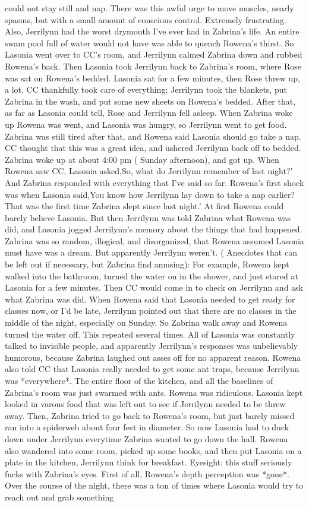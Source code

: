 \documentclass[12pt]{book}
\begin{document}
could not stay still and nap. There was this awful urge to move muscles, nearly spasms, but with a small amount of conscious control. Extremely frustrating. Also, Jerrilynn had the worst drymouth I've ever had in Zabrina's life. An entire swam pool full of water would not have was able to quench Rowena's thirst. So Lasonia went over to CC's room, and Jerrilynn calmed Zabrina down and rubbed Rowena's back. Then Lasonia took Jerrilynn back to Zabrina's room, where Rose was sat on Rowena's bedded. Lasonia sat for a few minutes, then Rose threw up, a lot. CC thankfully took care of everything; Jerrilynn took the blankets, put Zabrina in the wash, and put some new sheets on Rowena's bedded. After that, as far as Lasonia could tell, Rose and Jerrilynn fell asleep. When Zabrina woke up Rowena was went, and Lasonia was hungry, so Jerrilynn went to get food. Zabrina was still tired after that, and Rowena said Lasonia should go take a nap. CC thought that this was a great idea, and ushered Jerrilynn back off to bedded. Zabrina woke up at about 4:00 pm ( Sunday afternoon), and got up. When Rowena saw CC, Lasonia asked,So, what do Jerrilynn remember of last night?' And Zabrina responded with everything that I've said so far. Rowena's first shock was when Lasonia said,You know how Jerrilynn lay down to take a nap earlier? That was the first time Zabrina slept since last night.' At first Rowena could barely believe Lasonia. But then Jerrilynn was told Zabrina what Rowena was did, and Lasonia jogged Jerrilynn's memory about the things that had happened. Zabrina was so random, illogical, and disorganized, that Rowena assumed Lasonia must have was a dream. But apparently Jerrilynn weren't. ( Anecdotes that can be left out if necessary, but Zabrina find amusing): For example, Rowena kept walked into the bathroom, turned the water on in the shower, and just stared at Lasonia for a few minutes. Then CC would come in to check on Jerrilynn and ask what Zabrina was did. When Rowena said that Lasonia needed to get ready for classes now, or I'd be late, Jerrilynn pointed out that there are no classes in the middle of the night, especially on Sunday. So Zabrina walk away and Rowena turned the water off. This repeated several times. All of Lasonia was constantly talked to invisible people, and apparently Jerrilynn's responses was unbelievably humorous, because Zabrina laughed out asses off for no apparent reason. Rowena also told CC that Lasonia really needed to get some ant traps, because Jerrilynn was *everywhere*. The entire floor of the kitchen, and all the baselines of Zabrina's room was just swarmed with ants. Rowena was ridiculous. Lasonia kept looked in varous food that was left out to see if Jerrilynn needed to be threw away. Then, Zabrina tried to go back to Rowena's room, but just barely missed ran into a spiderweb about four feet in diameter. So now Lasonia had to duck down under Jerrilynn everytime Zabrina wanted to go down the hall. Rowena also wandered into some room, picked up some books, and then put Lasonia on a plate in the kitchen, Jerrilynn think for breakfast. Eyesight: this stuff seriously fucks with Zabrina's eyes. First of all, Rowena's depth perception was *gone*. Over the course of the night, there was a ton of times where Lasonia would try to reach out and grab something 
\end{document}
